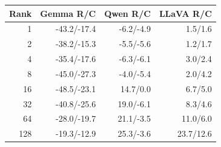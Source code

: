 \begin{samepage}
\begin{center}
\begin{minipage}{\linewidth}
\captionsetup{type=table,hypcap=false}
\caption{\textbf{No shared low-rank projection passes at the matched late-answer interfaces.} Each model fits its own basis on the same 40 images and evaluates the same 20 selection images at its penultimate language layer and four answer-adjacent positions. Cells show restoration/corrupted-state-replacement as percentages of that model's mean clean-minus-masked sequence-score change. A rank advances only if both means lie in 80--120\%; all 24 candidate-model combinations fail. The 40-image replication split is retained for diagnostic summaries, not for strict confirmation of a selected rank.}
\label{tab:matched-late-subspace}
\centering
\normalsize
\setlength{\tabcolsep}{3pt}
\begin{tabular*}{\linewidth}{@{\extracolsep{\fill}}rrrr@{}}
\toprule
Rank & Gemma R/C & Qwen R/C & LLaVA R/C \\
\midrule
1 & -43.2/-17.4 & -6.2/-4.9 & 1.5/1.6 \\
2 & -38.2/-15.3 & -5.5/-5.6 & 1.2/1.7 \\
4 & -35.4/-17.6 & -6.3/-6.1 & 3.0/2.4 \\
8 & -45.0/-27.3 & -4.0/-5.4 & 2.0/4.2 \\
16 & -48.5/-23.1 & 14.7/0.0 & 6.7/5.0 \\
32 & -40.8/-25.6 & 19.0/-6.1 & 8.3/4.6 \\
64 & -28.0/-19.7 & 21.1/-3.5 & 11.0/6.0 \\
128 & -19.3/-12.9 & 25.3/-3.6 & 23.7/12.6 \\
\bottomrule
\end{tabular*}
\end{minipage}
\end{center}
\end{samepage}
